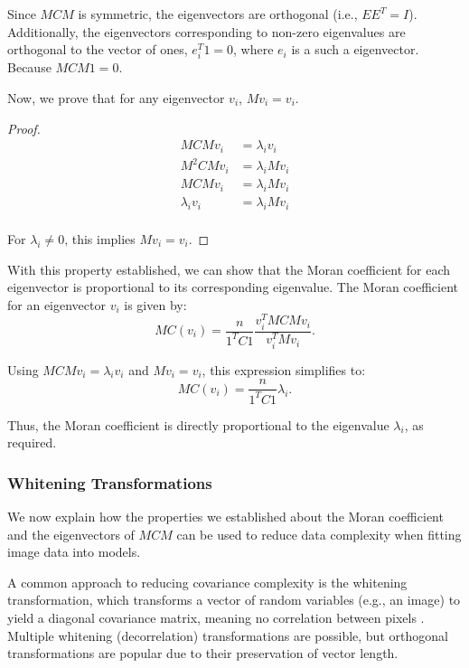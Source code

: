 \documentclass[12pt]{article}
\begin{document}
Since \( M C M \) is symmetric, the eigenvectors are orthogonal (i.e., \( E E^T = I \)). Additionally, the eigenvectors corresponding to non-zero eigenvalues are orthogonal to the vector of ones, \( e_i^T 1 = 0 \), where \( e_i \) is a such a eigenvector. Because \( M C M 1 = 0 \).

Now, we prove that for any eigenvector \( v_i \), \( M v_i = v_i \).
\begin{proof}
  \begin{align*}
    M C M v_i & = \lambda_i v_i \\
    M^2 C M v_i & = \lambda_i M v_i \\
    M C M v_i & = \lambda_i M v_i \\
    \lambda_i v_i & = \lambda_i M v_i \\
  \end{align*}

  For \( \lambda_i \neq 0 \), this implies \( M v_i = v_i \).
\end{proof}

With this property established, we can show that the Moran coefficient for each eigenvector is proportional to its corresponding eigenvalue. The Moran coefficient for an eigenvector \( v_i \) is given by:
\[
  M C (v_i)=\frac{n}{1^T C 1} \frac{v_i^T M C M v_i}{v_i^T M v_i}.
\]

Using \( M C M v_i = \lambda_i v_i \) and \( M v_i = v_i \), this expression simplifies to:
\[
  M C (v_i)=\frac{n}{1^T C 1} \lambda_i.
\]

Thus, the Moran coefficient is directly proportional to the eigenvalue \( \lambda_i \), as required.

\subsubsection{Whitening Transformations}

We now explain how the properties we established about the Moran coefficient and the eigenvectors of \( M C M \) can be used to reduce data complexity when fitting image data into models.

A common approach to reducing covariance complexity is the whitening transformation, which transforms a vector of random variables (e.g., an image) to yield a diagonal covariance matrix, meaning no correlation between pixels . Multiple whitening (decorrelation) transformations are possible, but orthogonal transformations are popular due to their preservation of vector length.
\end{document}
